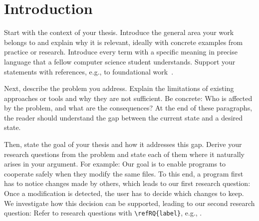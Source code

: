 \chapter{Introduction}\label{chap:introduction}

Start with the context of your thesis.
Introduce the general area your work belongs to and explain why it is relevant, ideally with concrete examples from practice or research.
Introduce every term with a specific meaning in precise language that a fellow computer science student understands.
Support your statements with references, e.g., to foundational work~\cite{Lamport1994}.

Next, describe the problem you address.
Explain the limitations of existing approaches or tools and why they are not sufficient.
Be concrete: Who is affected by the problem, and what are the consequences?
At the end of these paragraphs, the reader should understand the gap between the current state and a desired state.

Then, state the goal of your thesis and how it addresses this gap.
Derive your research questions from the problem and state each of them where it naturally arises in your argument.
For example: Our goal is to enable programs to cooperate safely when they modify the same files.
To this end, a program first has to notice changes made by others, which leads to our first research question:
%
%
Once a modification is detected, the user has to decide which changes to keep.
We investigate how this decision can be supported, leading to our second research question:
%
%
Refer to research questions with \verb|\refRQ{label}|, e.g., .

